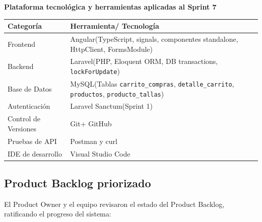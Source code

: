 \documentclass[12pt,a4paper]{article}
\begin{document}
\textbf{Plataforma tecnológica y herramientas aplicadas al Sprint 7}

\begin{center}
\small
\begin{tabularx}{\textwidth}{p{4.8cm} L}
\toprule
\textbf{Categoría} & \textbf{Herramienta/ Tecnología} \\
\midrule
Frontend & Angular(TypeScript, signals, componentes standalone, HttpClient, FormsModule) \\
Backend & Laravel(PHP, Eloquent ORM, DB transactions, \texttt{lockForUpdate}) \\
Base de Datos & MySQL(Tablas \texttt{carrito\_compras}, \texttt{detalle\_carrito}, \texttt{productos}, \texttt{producto\_tallas}) \\
Autenticación & Laravel Sanctum(Sprint 1) \\
Control de Versiones & Git+ GitHub \\
Pruebas de API & Postman y curl \\
IDE de desarrollo & Visual Studio Code \\
\bottomrule
\end{tabularx}
\end{center}

\subsection*{Product Backlog priorizado}

El Product Owner y el equipo revisaron el estado del Product Backlog, ratificando el progreso del sistema:
\end{document}
